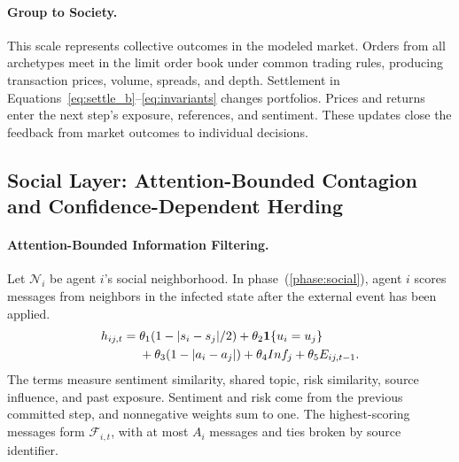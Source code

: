 \paragraph{Group to Society.} This scale represents collective outcomes in the modeled market. Orders from all archetypes meet in the limit order book under common trading rules, producing transaction prices, volume, spreads, and depth. Settlement in Equations~\eqref{eq:settle_b}--\eqref{eq:invariants} changes portfolios. Prices and returns enter the next step's exposure, references, and sentiment. These updates close the feedback from market outcomes to individual decisions.

\subsection{Social Layer: Attention-Bounded Contagion and Confidence-Dependent Herding}
\label{sec:method:social}

\paragraph{Attention-Bounded Information Filtering.} Let $\mathcal N_i$ be agent $i$'s social neighborhood. In phase~(\ref{phase:social}), agent $i$ scores messages from neighbors in the infected state after the external event has been applied.
\begin{equation}
\begin{split}h_{ij,t}={}&\theta_1(1-|s_i-s_j|/2)+\theta_2\mathbf{1}\{u_i=u_j\}\\&+\theta_3(1-|a_i-a_j|)+\theta_4 Inf_j+\theta_5 E_{ij,t-1}.\end{split}
  \label{eq:message_score}
\end{equation}
The terms measure sentiment similarity, shared topic, risk similarity, source influence, and past exposure. Sentiment and risk come from the previous committed step, and nonnegative weights sum to one. The highest-scoring messages form $\mathcal F_{i,t}$, with at most $A_i$ messages and ties broken by source identifier.

